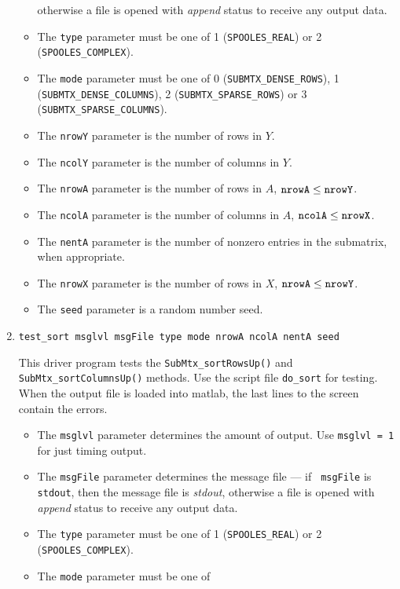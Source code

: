 \begin{enumerate}
\begin{itemize}
otherwise a file is opened with {\it append} status to receive any
output data.
\item
The {\tt type} parameter must be one of 1 ({\tt SPOOLES\_REAL})
or 2 ({\tt SPOOLES\_COMPLEX}). 
\item
The {\tt mode} parameter must be one of
0 ({\tt SUBMTX\_DENSE\_ROWS}),
1 ({\tt SUBMTX\_DENSE\_COLUMNS}),
2 ({\tt SUBMTX\_SPARSE\_ROWS}) or
3 ({\tt SUBMTX\_SPARSE\_COLUMNS}).
\item
The {\tt nrowY} parameter is the number of rows in $Y$.
\item
The {\tt ncolY} parameter is the number of columns in $Y$.
\item
The {\tt nrowA} parameter is the number of rows in $A$,
${\tt nrowA} \le {\tt nrowY}$.
\item
The {\tt ncolA} parameter is the number of columns in $A$,
${\tt ncolA} \le {\tt nrowX}$.
\item
The {\tt nentA} parameter is the number of nonzero entries in the
submatrix, when appropriate.
\item
The {\tt nrowX} parameter is the number of rows in $X$,
${\tt nrowA} \le {\tt nrowY}$.
\item
The {\tt seed} parameter is a random number seed.
\end{itemize}
\item
\begin{verbatim}
test_sort msglvl msgFile type mode nrowA ncolA nentA seed
\end{verbatim}
This driver program tests 
the {\tt SubMtx\_sortRowsUp()} 
and {\tt SubMtx\_sortColumnsUp()} 
methods.
Use the script file {\tt do\_sort} for testing.
When the output file is loaded into matlab,
the last lines to the screen contain the errors.
\par
\begin{itemize}
\item
The {\tt msglvl} parameter determines the amount of output.
Use {\tt msglvl = 1} for just timing output.
\item
The {\tt msgFile} parameter determines the message file --- if {\tt
msgFile} is {\tt stdout}, then the message file is {\it stdout},
otherwise a file is opened with {\it append} status to receive any
output data.
\item
The {\tt type} parameter must be one of 1 ({\tt SPOOLES\_REAL})
or 2 ({\tt SPOOLES\_COMPLEX}). 
\item
The {\tt mode} parameter must be one of

\end{itemize}
\end{enumerate}
